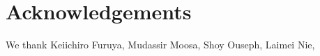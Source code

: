 \documentclass[a4paper,11pt]{article}
\theoremstyle{definition}
\newcommand{\nn}{\nonumber}
\newcommand{\lb}{\left(}
\newcommand{\rb}{\right)}
\newcommand{\mO}{\mathcal{O}}
\newcommand{\NL}[1]{\textcolor{blue}{#1}}
\newcommand{\p}{\partial}
\begin{document}



\section*{Acknowledgements}
We thank Keiichiro Furuya, Mudassir Moosa, Shoy Ouseph, Laimei Nie, 


\appendix
\end{document}
